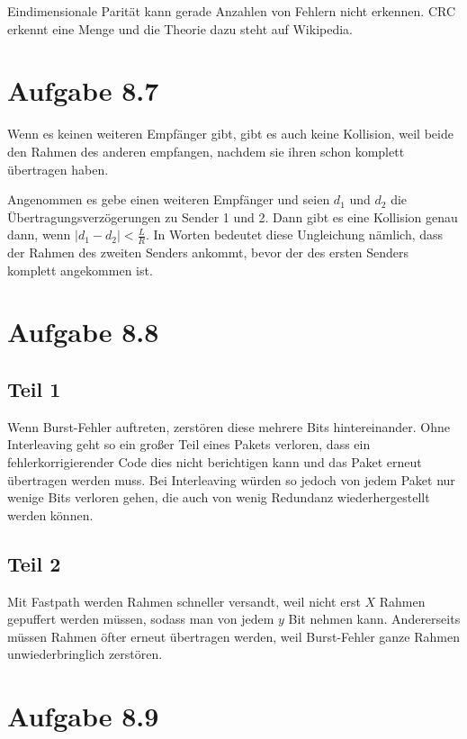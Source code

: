 \documentclass[10pt,a4paper]{article}
\begin{document}
Eindimensionale Parität kann gerade Anzahlen von Fehlern nicht erkennen. CRC
erkennt eine Menge und die Theorie dazu steht auf Wikipedia.

\section{Aufgabe 8.7}

Wenn es keinen weiteren Empfänger gibt, gibt es auch keine Kollision, weil beide
den Rahmen des anderen empfangen, nachdem sie ihren schon komplett übertragen
haben.

Angenommen es gebe einen weiteren Empfänger und seien $d_{1}$ und $d_{2}$ die
Übertragungsverzögerungen zu Sender 1 und 2. Dann gibt es eine Kollision genau
dann, wenn $|d_{1} - d_{2}| < \frac{L}{R}$. In Worten bedeutet diese Ungleichung
nämlich, dass der Rahmen des zweiten Senders ankommt, bevor der des ersten
Senders komplett angekommen ist.

\section{Aufgabe 8.8}

\subsection{Teil 1}

Wenn Burst-Fehler auftreten, zerstören diese mehrere Bits hintereinander. Ohne
Interleaving geht so ein großer Teil eines Pakets verloren, dass ein
fehlerkorrigierender Code dies nicht berichtigen kann und das Paket erneut
übertragen werden muss. Bei Interleaving würden so jedoch von jedem Paket nur
wenige Bits verloren gehen, die auch von wenig Redundanz wiederhergestellt
werden können.

\subsection{Teil 2}

Mit Fastpath werden Rahmen schneller versandt, weil nicht erst $X$ Rahmen
gepuffert werden müssen, sodass man von jedem $y$ Bit nehmen kann. Andererseits
müssen Rahmen öfter erneut übertragen werden, weil Burst-Fehler ganze Rahmen
unwiederbringlich zerstören.

\section{Aufgabe 8.9}
\end{document}
